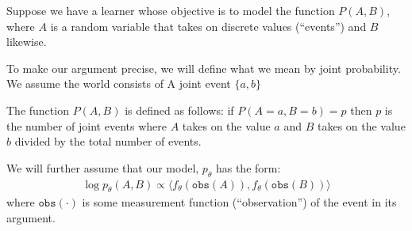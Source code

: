 Suppose we have a learner whose objective is to model the function $P(A,B)$, where $A$ is a random variable that takes on discrete values (``events'') and $B$ likewise. 

To make our argument precise, we will define what we mean by joint probability. We assume the world consists of A joint event $\{a,b\}$ 

The function $P(A,B)$ is defined as follows: if $P(A=a, B=b) = p$ then $p$ is the number of joint events where $A$ takes on the value $a$ and $B$ takes on the value $b$ divided by the total number of events.

We will further assume that our model, $p_{\theta}$ has the form:
\begin{align}
    \log p_{\theta}(A,B) \propto \langle f_{\theta}(\texttt{obs}(A)), f_{\theta}(\texttt{obs}(B)) \rangle
\end{align}
where $\texttt{obs}(\cdot)$ is some measurement function (``observation'') of the event in its argument.








